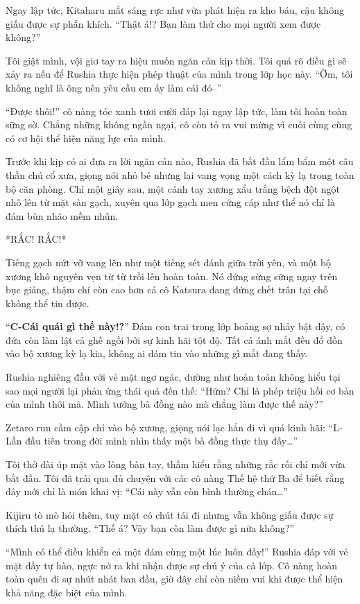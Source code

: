 \documentclass[../main.tex]{subfiles}
\begin{document}
Ngay lập tức, Kitaharu mắt sáng rực như vừa phát hiện ra kho báu, cậu không giấu được sự phấn khích. ``Thật á!? Bạn làm thử cho mọi người xem được không?''

Tôi giật mình, vội giơ tay ra hiệu muốn ngăn cản kịp thời. Tôi quá rõ điều gì sẽ xảy ra nếu để Rushia thực hiện phép thuật của mình trong lớp học này. ``Ờm, tôi không nghĩ là ông nên yêu cầu em ấy làm cái đó--''

``Được thôi!'' cô nàng tóc xanh tươi cười đáp lại ngay lập tức, làm tôi hoàn toàn sững sờ. Chẳng những không ngần ngại, cô còn tỏ ra vui mừng vì cuối cùng cũng có cơ hội thể hiện năng lực của mình.

Trước khi kịp có ai đưa ra lời ngăn cản nào, Rushia đã bắt đầu lẩm bẩm một câu thần chú cổ xưa, giọng nói nhỏ bé nhưng lại vang vọng một cách kỳ lạ trong toàn bộ căn phòng. Chỉ một giây sau, một cánh tay xương xẩu trắng bệch đột ngột nhô lên từ mặt sàn gạch, xuyên qua lớp gạch men cứng cáp như thể nó chỉ là đám bùn nhão mềm nhũn.

*RẮC! RẮC!*

Tiếng gạch nứt vỡ vang lên như một tiếng sét đánh giữa trời yên, và một bộ xương khô nguyên vẹn từ từ trồi lên hoàn toàn. Nó đứng sừng sững ngay trên bục giảng, thậm chí còn cao hơn cả cô Katsura đang đứng chết trân tại chỗ không thể tin được.

``\textbf{C-Cái quái gì thế này!?}'' Đám con trai trong lớp hoảng sợ nhảy bật dậy, có đứa còn làm lật cả ghế ngồi bởi sự kinh hãi tột độ. Tất cả ánh mắt đều đổ dồn vào bộ xương kỳ lạ kia, không ai dám tin vào những gì mắt đang thấy.

Rushia nghiêng đầu với vẻ mặt ngơ ngác, dường như hoàn toàn không hiểu tại sao mọi người lại phản ứng thái quá đến thế: ``Hửm? Chỉ là phép triệu hồi cơ bản của mình thôi mà. Mình tưởng bà đồng nào mà chẳng làm được thế này?''

Zetaro run cầm cập chỉ vào bộ xương, giọng nói lạc hẳn đi vì quá kinh hãi: ``L-Lần đầu tiên trong đời mình nhìn thấy một bà đồng thực thụ đấy\dots''

Tôi thở dài úp mặt vào lòng bàn tay, thầm hiểu rằng những rắc rối chỉ mới vừa bắt đầu. Tôi đã trải qua đủ chuyện với các cô nàng Thế hệ thứ Ba để biết rằng đây mới chỉ là món khai vị: ``Cái này vẫn còn bình thường chán\dots''

Kijiru tò mò hỏi thêm, tuy mặt có chút tái đi nhưng vẫn không giấu được sự thích thú lạ thường. ``Thế á? Vậy bạn còn làm được gì nữa không?''

``Mình có thể điều khiển cả một đám cùng một lúc luôn đấy!'' Rushia đáp với vẻ mặt đầy tự hào, ngực nở ra khi nhận được sự chú ý của cả lớp. Cô nàng hoàn toàn quên đi sự nhút nhát ban đầu, giờ đây chỉ còn niềm vui khi được thể hiện khả năng đặc biệt của mình.
\end{document}
